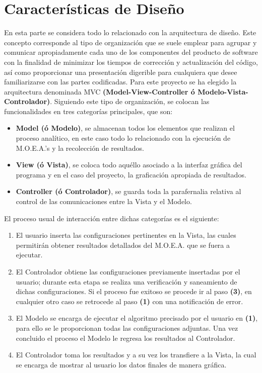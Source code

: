 \documentclass[class=report, crop=false]{standalone}
\begin{document}
\section{Características de Diseño}
En esta parte se considera todo lo relacionado con la arquitectura 
de diseño.\break
Este concepto corresponde al tipo de organización que se suele 
emplear para agrupar y comunicar apropiadamente cada uno de los 
componentes del producto de software con la finalidad de minimizar 
los tiempos de corrección y actualización del código, así como 
proporcionar una presentación digerible para cualquiera que desee 
familiarizarse con las partes codificadas.\medskip\break
Para este proyecto se ha elegido la arquitectura denominada MVC 
\textbf{(Model-View-Controller ó Modelo-Vista-Controlador)}.\break
Siguiendo este tipo de organización, se colocan las funcionalidades 
en tres categorías principales, que son:

\begin{itemize}
\item \textbf{Model (ó Modelo)}, se almacenan todos los elementos 
que realizan el proceso analítico, en este caso todo lo relacionado 
con la ejecución de M.O.E.A.’s y la recolección de resultados.
\item \textbf{View (ó Vista)}, se coloca todo aquéllo asociado a 
la interfaz gráfica del programa y en el caso del proyecto, la 
graficación apropiada de resultados.
\item \textbf{Controller (ó Controlador)}, se guarda toda la 
parafernalia relativa al control de las comunicaciones entre la 
Vista y el Modelo.
\end{itemize}

El proceso usual de interacción entre dichas categorías es el 
siguiente:

\begin{enumerate}
\item El usuario inserta las configuraciones pertinentes en la 
Vista, las cuales permitirán obtener resultados detallados del 
M.O.E.A. que se fuera a ejecutar.
\item El Controlador obtiene las configuraciones previamente 
insertadas por el usuario; durante esta etapa se realiza una 
verificación y saneamiento de dichas configuraciones. Si el 
proceso fue exitoso se procede ir al paso \textbf{(3)}, en 
cualquier otro caso se retrocede al paso \textbf{(1)} con una 
notificación de error.
\item El Modelo se encarga de ejecutar el algoritmo precisado 
por el usuario en \textbf{(1)}, para ello se le proporcionan 
todas las configuraciones adjuntas. Una vez concluido el proceso 
el Modelo le regresa los resultados al Controlador.
\item El Controlador toma los resultados y a su vez los transfiere 
a la Vista, la cual se encarga de mostrar al usuario los datos 
finales de manera gráfica.
\end{enumerate}
\end{document}
